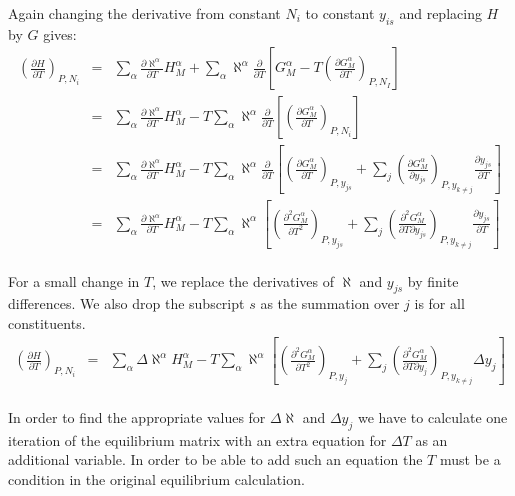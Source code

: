 \documentclass[12pt]{article}
\begin{document}
Again changing the derivative from constant $N_i$ to constant $y_{is}$
and replacing $H$ by $G$ gives:
\begin{eqnarray}
\left(\frac{\partial H}{\partial T}\right)_{P,N_i} &=& 
\sum_{\alpha}\frac{\partial \aleph^{\alpha}}{\partial T} H_M^{\alpha}+
\sum_{\alpha}\aleph^{\alpha}\frac{\partial }{\partial T}
\left[G_M^{\alpha}-T\left(\frac{\partial G_M^{\alpha}}{\partial T}\right)_{P,N_I}\right]\nonumber\\&=&
\sum_{\alpha}\frac{\partial \aleph^{\alpha}}{\partial T} H_M^{\alpha}-T
\sum_{\alpha}\aleph^{\alpha}\frac{\partial }{\partial T}
\left[\left(\frac{\partial G_M^{\alpha}}{\partial T}\right)_{P,N_i}\right]\nonumber\\&=&
\sum_{\alpha}\frac{\partial \aleph^{\alpha}}{\partial T} H_M^{\alpha}-T
\sum_{\alpha}\aleph^{\alpha}\frac{\partial }{\partial T}
\left[\left(\frac{\partial G_M^{\alpha}}{\partial T}\right)_{P,y_{js}}+
\sum_j\left(\frac{\partial G_M^{\alpha}}{\partial y_{js}}\right)_{P,y_{k\ne j}}\frac{\partial y_{js}}{\partial T}\right]\nonumber\\&=&
\sum_{\alpha}\frac{\partial \aleph^{\alpha}}{\partial T} H_M^{\alpha}-T
\sum_{\alpha}\aleph^{\alpha}
\left[\left(\frac{\partial^2 G_M^{\alpha}}{\partial T^2}\right)_{P,y_{js}}+
\sum_j\left(\frac{\partial^2 G_M^{\alpha}}{\partial T\partial y_{js}}\right)_{P,y_{k\ne j}}\frac{\partial y_{js}}{\partial T}\right]\nonumber\\
\label{eq:cpfinal}
\end{eqnarray}

For a small change in $T$, we replace the derivatives of $\aleph$ and
$y_{js}$ by finite differences.  We also drop the subscript $s$ as the
summation over $j$ is for all constituents.
\begin{eqnarray}
\left(\frac{\partial H}{\partial T}\right)_{P,N_i} &=& 
\sum_{\alpha}\Delta\aleph^{\alpha} H_M^{\alpha}-T
\sum_{\alpha}\aleph^{\alpha}
\left[\left(\frac{\partial^2 G_M^{\alpha}}{\partial T^2}\right)_{P,y_{j}}+
\sum_j\left(\frac{\partial^2 G_M^{\alpha}}{\partial T\partial y_{j}}\right)_{P,y_{k\ne j}}\Delta y_{j}\right]\nonumber\\ \label{eq:cpfinal2}
\end{eqnarray}

In order to find the appropriate values for $\Delta\aleph$ and $\Delta
y_j$ we have to calculate one iteration of the equilibrium matrix with
an extra equation for $\Delta T$ as an additional variable.  In order
to be able to add such an equation the $T$ must be a condition in the
original equilibrium calculation.
\end{document}
